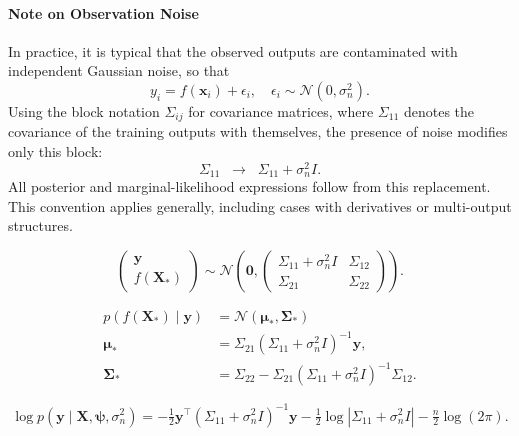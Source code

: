 \documentclass[12pt]{article}
\begin{document}
\paragraph{Note on Observation Noise}
\label{par:gp_noise}
In practice, it is typical that the observed outputs are contaminated with
independent Gaussian noise, so that
\[
y_i = f(\mathbf{x}_i) + \epsilon_i,
\quad \epsilon_i \sim \mathcal{N}(0, \sigma_n^2).
\]
Using the block notation $\Sigma_{ij}$ for covariance matrices, where
$\Sigma_{11}$ denotes the covariance of the training outputs with themselves,
the presence of noise modifies only this block:
\[
\Sigma_{11} \;\;\longrightarrow\;\; \Sigma_{11} + \sigma_n^2 I.
\]
All posterior and marginal-likelihood expressions follow from this replacement.
This convention applies generally, including cases with derivatives or
multi-output structures.

\begin{equation}
	\label{eqn:noisy_joint}
	\begin{pmatrix}
		\mathbf{y} \\
		f(\mathbf{X}_*)
	\end{pmatrix}
	\sim \mathcal{N}\left(
	\mathbf{0},
	\begin{pmatrix}
		\Sigma_{11} + \sigma_n^2 I & \Sigma_{12} \\
		\Sigma_{21} & \Sigma_{22}
	\end{pmatrix}
	\right).
\end{equation}

\begin{equation}
	\label{eqn:noisy_posterior}
	\begin{split}
		p(f(\mathbf{X}_*) \mid \mathbf{y}) &= \mathcal{N}(\boldsymbol{\mu}_*, \boldsymbol{\Sigma}_*) \\
		\boldsymbol{\mu}_* &= \Sigma_{21} \left(\Sigma_{11} + \sigma_n^2 I\right)^{-1} \mathbf{y}, \\
		\boldsymbol{\Sigma}_* &= \Sigma_{22} - \Sigma_{21} \left(\Sigma_{11} + \sigma_n^2 I\right)^{-1} \Sigma_{12}.
	\end{split}
\end{equation}

\begin{equation}
	\label{eqn:noisy_mll}
	\log p(\mathbf{y} \mid \mathbf{X}, \boldsymbol{\psi}, \sigma_n^2)
	= -\tfrac{1}{2}\mathbf{y}^\top\!\left(\Sigma_{11} + \sigma_n^2 I\right)^{-1}\mathbf{y}
	-\tfrac{1}{2}\log\!\left|\Sigma_{11} + \sigma_n^2 I\right|
	-\tfrac{n}{2}\log(2\pi).
\end{equation}
\end{document}
